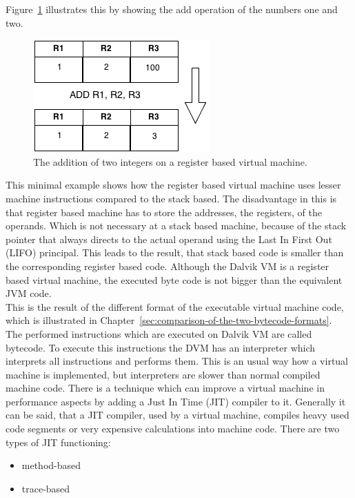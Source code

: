Figure~\ref{fig:register-based-addition} illustrates this by showing the add operation of the numbers one and two.
\begin{figure}[h]
\begin{center}
\includegraphics[scale=0.65]{images/register-based-addition.png} 
\caption{The addition of two integers on a register based virtual machine.}
\label{fig:register-based-addition}
\end{center}
\end{figure}
This minimal example shows how the register based virtual machine uses lesser machine instructions compared to the stack based.
The disadvantage in this is that register based machine has to store the addresses, the registers, of the operands.
Which is not necessary at a stack based machine, because of the stack pointer that always directs to the actual operand using the Last In First Out (LIFO) principal.
This leads to the result, that stack based code is smaller than the corresponding register based code.
Although the Dalvik VM is a register based virtual machine, the executed byte code is not bigger than the equivalent JVM code.~\cite{shi2008virtual}\\
This is the result of the different format of the executable virtual machine code, which is illustrated in Chapter~\ref{sec:comparison-of-the-two-bytecode-formats}.
\\
The performed instructions which are executed on Dalvik VM are called bytecode.
To execute this instructions the DVM has an interpreter which interprets all instructions and performs them.
This is an usual way how a virtual machine is implemented, but interpreters are slower than normal compiled machine code.
There is a technique which can improve a virtual machine in performance aspects by adding a Just In Time (JIT) compiler to it.
Generally it can be said, that a JIT compiler, used by a virtual machine, compiles heavy used code segments or very expensive calculations into machine code.
There are two types of JIT functioning:
\begin{itemize}
\item method-based
\item trace-based
\end{itemize}
